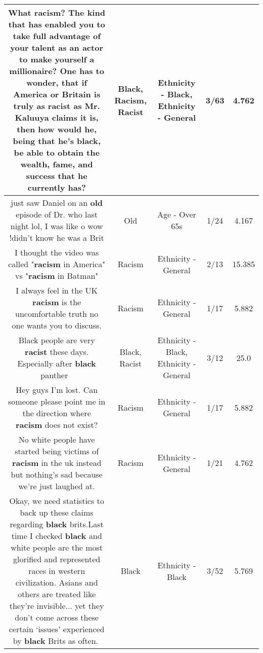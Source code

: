 \documentclass[11pt]{article}
\newlength\mylength
\begin{document}
\begin{center}
\begin{longtable}{|C{.65\mylength}|C{.30\mylength}|C{.12\mylength}|C{.12\mylength}|C{.12\mylength}|}
  \small What \textbf{racism}? The kind that has enabled you to take full advantage of your talent as an actor to make yourself a millionaire? One has to wonder, that if America or Britain is truly as \textbf{racist} as Mr. Kaluuya claims it is, then how would he, being that he's \textbf{black}, be able to obtain the wealth, fame, and success that he currently has?\normalsize   & Black, Racism, Racist & Ethnicity - Black, Ethnicity - General & 3/63 & 4.762 \\  \hline
  \small just saw Daniel on an \textbf{old} episode of Dr. who last night lol, I was like o wow !didn't know he was a Brit\normalsize   & Old & Age - Over 65s & 1/24 & 4.167 \\  \hline
  \small I thought the video was called "\textbf{racism} in America" vs "\textbf{racism} in Batman"\normalsize   & Racism & Ethnicity - General & 2/13 & 15.385 \\  \hline
  \small I always feel in the UK \textbf{racism} is the uncomfortable truth no one wants you to discuss.\normalsize   & Racism & Ethnicity - General & 1/17 & 5.882 \\  \hline
  \small Black people are very \textbf{racist} these days. Especially after \textbf{black} panther 🤣\normalsize   & Black, Racist & Ethnicity - Black, Ethnicity - General & 3/12 & 25.0 \\  \hline
  \small Hey guys I'm lost. Can someone please point me in the direction where \textbf{racism} does not exist?\normalsize   & Racism & Ethnicity - General & 1/17 & 5.882 \\  \hline
  \small No white people have started being victims of \textbf{racism} in the uk instead but nothing's sad because we're just laughed at.\normalsize   & Racism & Ethnicity - General & 1/21 & 4.762 \\  \hline
  \small Okay, we need statistics to back up these claims regarding \textbf{black} brits.Last time I checked \textbf{black} and white people are the most glorified and represented races in western civilization. Asians and others are treated like they're invisible... yet they don't come across these certain ‘issues' experienced by \textbf{black} Brits as often.🤔\normalsize   & Black & Ethnicity - Black & 3/52 & 5.769 \\  \hline

\end{longtable}
\end{center}
\end{document}
